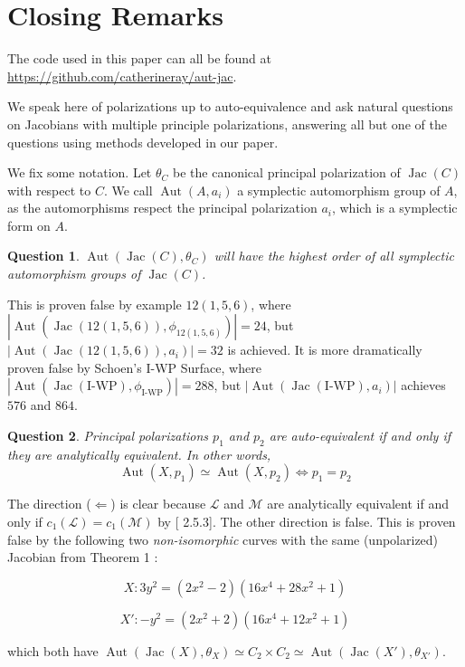 \documentclass[12pt,reqno]{amsart}
\DeclareMathOperator{\Aut}{Aut}
\DeclareMathOperator{\Jac}{Jac}
\newcommand{\Z}{\mathbb{Z}}
\newcommand{\mc}{\mathcal}
\newtheorem*{question}{Question}
\theoremstyle{definition}
\theoremstyle{remark}
\begin{document}
\section{Closing Remarks}
\label{sec:questions}

The code used in this paper can all be found at \url{https://github.com/catherineray/aut-jac}.

We speak here of polarizations up to auto-equivalence and ask natural questions on Jacobians with multiple principle polarizations, answering all but one of the questions using methods developed in our paper.

We fix some notation. Let $\theta_C$ be the canonical principal polarization of $\Jac(C)$ with respect to $C$. We call $\Aut(A, a_i)$ a symplectic automorphism group of $A$, as the automorphisms respect the principal polarization $a_i$, which is a symplectic form on $A$.

\begin{question} $\Aut(\Jac(C), \theta_C)$ will have the highest order of all symplectic automorphism groups of $\Jac(C)$. \end{question}

This is proven false by example $12(1,5,6)$, where $|\Aut(\Jac(12(1, 5, 6)), \phi_{12(1, 5, 6)})| = 24$, but $|\Aut(\Jac(12(1, 5, 6)), a_i)| = 32$ is achieved. It is more dramatically proven false by Schoen's I-WP Surface, where $|\Aut(\Jac(\text{I-WP}), \phi_{\text{I-WP}})| = 288$, but $|\Aut(\Jac(\text{I-WP}), a_i)|$ achieves $576$ and $864$.

\begin{question} Principal polarizations $p_1$ and $p_2$ are auto-equivalent if and only if they are analytically equivalent. In other words, $$\Aut(X, p_1) \simeq \Aut(X, p_2) \Leftrightarrow p_1 = p_2$$ \end{question}

The direction ($\Leftarrow$) is clear because $\mc{L}$ and $\mc{M}$ are analytically equivalent if and only if $c_1(\mc{L}) = c_1(\mc{M})$ by [\cite{bl} 2.5.3]. The other direction is false.  This is proven false by the following two \textit{non-isomorphic} curves with the same (unpolarized) Jacobian from Theorem 1  \cite{howe1}:

$$X: 3y^2 = (2x^2- 2)(16x^4 + 28x^2 + 1)$$ 

$$X': -y^2 = (2x^2 + 2)(16x^4 + 12x^2 + 1)$$ 

which both have $\Aut(\Jac(X), \theta_X)\simeq C_2 \times C_2 \simeq \Aut(\Jac(X'), \theta_{X'})$. %
\end{document}
